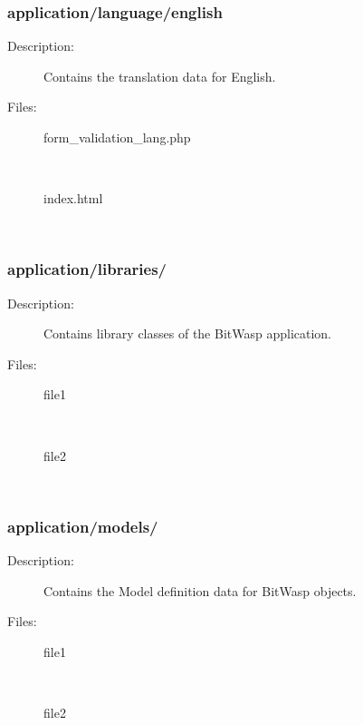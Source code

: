 \documentclass[11pt]{article} %
\begin{document}
\subsubsection{application/language/english}
\begin{description}
\item[Description:] Contains the translation data for English.
\item[Files:] \textbf{ }
\begin{description}
\item[form\_validation\_lang.php]  \textbf{ }\\
\item[index.html]  \textbf{ }\\
\end{description} 
\end{description} 

\subsubsection{application/libraries/}
\begin{description}
\item[Description:] Contains library classes of the BitWasp application.
\item[Files:] \textbf{ }
\begin{description}
\item[file1]  \textbf{ }\\
\item[file2]  \textbf{ }\\
\end{description} 
\end{description} 

\subsubsection{application/models/}
\begin{description}
\item[Description:] Contains the Model definition data for BitWasp objects.
\item[Files:] \textbf{ }
\begin{description}
\item[file1]  \textbf{ }\\
\item[file2]  \textbf{ }\\
\end{description} 
\end{description} 
\end{document}
